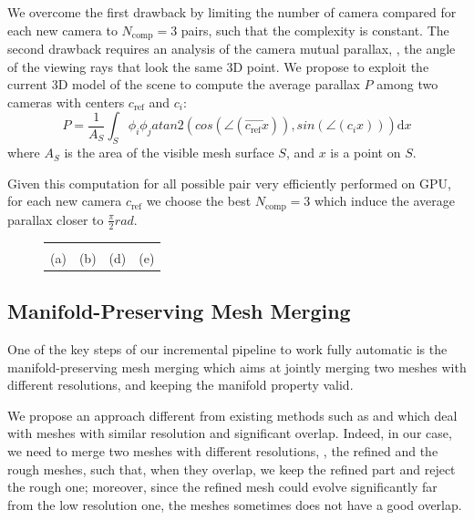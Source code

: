 \documentclass[times,10pt,twocolumn]{article}
\begin{document}
We overcome the first drawback by limiting the number of camera compared for each new camera to $N_{\text{comp}}=3$ pairs, such that the complexity is constant.
The second drawback requires an analysis of the camera mutual parallax, \ie, the angle of the viewing rays that look the same 3D point.
We propose to exploit the current 3D model of the scene to compute the average parallax $P$ among two cameras with centers $c_{\text{ref}}$ and $c_i$:
\begin{equation}
 P = \frac{1}{A_{\mathit{S}}}  \int_{\mathit{S}} \phi_i \phi_j atan2(cos(\angle(\overrightarrow{c_{\text{ref}}x})),sin(\angle(c_{i}x))) \textrm{d}x
\end{equation}
where $A_{\mathit{S}}$ is the area of the visible mesh surface $\mathit{S}$, and $x$ is a point on $\mathit{S}$.

Given this computation for all possible pair very efficiently performed on GPU, for each new camera $c_{\text{ref}}$  we choose the best $N_{\text{comp}}=3$  which induce the average parallax closer to $\frac{\pi}{2}rad$.




\begin{figure}[t]
\centering
\setlength{\tabcolsep}{1px}
\begin{tabular}{cccc}
{\def\svgwidth{0.23\textwidth}
  }&
{\def\svgwidth{0.23\textwidth}
  }&
{\def\svgwidth{0.23\textwidth}
  }&
{\def\svgwidth{0.23\textwidth}
  }\\
(a)&(b)&(d)&(e)\\
\end{tabular}
\label{fig:whymanifold}
\caption{}
\end{figure}

\subsection{Manifold-Preserving Mesh Merging}
\label{sub:merge}
One of the key steps of our incremental pipeline to work fully automatic is the manifold-preserving mesh merging which aims at jointly merging two meshes with different resolutions, and keeping the manifold property valid.

We propose an approach different from existing methods such as \cite{turk1994zippered} and \cite{VuPhD011} which deal with meshes with similar resolution and significant overlap.
Indeed, in our case, we need to merge two meshes with  different resolutions, \ie, the refined and the rough meshes, such that, when they overlap, we  keep the refined part and reject the rough one; moreover,  since the refined mesh could evolve significantly far from the low resolution one, the meshes sometimes does not have a good overlap.
\end{document}
